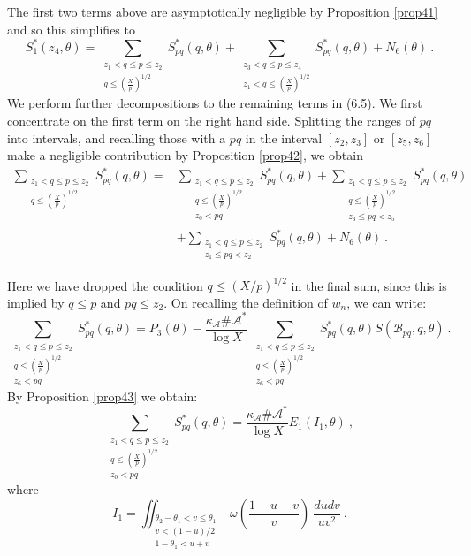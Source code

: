 \documentclass{amsart}
\numberwithin{equation}{subsection}
\begin{document}
The first two terms above are asymptotically negligible by Proposition \ref{prop41} and so this simplifies to
\[
S_1^*(z_4, \theta)=\sum_{\substack{z_1<q\leq p\leq z_2 \\ q\leq \left(\frac{X}{p}\right)^{1/2}}} S_{pq}^*(q, \theta)+ \sum_{\substack{z_3<q\leq p\leq z_4 \\ z_1<q\leq \left(\frac{X}{p}\right)^{1/2}}} S_{pq}^*(q, \theta) + N_6(\theta)\:. \tag{4.2}
\]
We perform further decompositions to the remaining terms in (6.5). We first concentrate on the first term on the right hand side. Splitting the ranges of $pq$ into intervals, and recalling those with a $pq$ in the interval $[z_2, z_3]$ or $[z_5, z_6]$ make a negligible contribution by Proposition \ref{prop42}, we obtain
\begin{align*}
\sum_{\substack{z_1<q\leq p\leq z_2 \\ q\leq \left(\frac{X}{p}\right)^{1/2}}} S_{pq}^*(q, \theta) =& \sum_{\substack{z_1<q\leq p\leq z_2 \\ q\leq \left(\frac{X}{p}\right)^{1/2} \\ z_0<pq}} S_{pq}^*(q, \theta)
+\sum_{\substack{z_1<q\leq p\leq z_2 \\ q\leq \left(\frac{X}{p}\right)^{1/2} \\ z_3\leq pq<z_5}} S_{pq}^*(q, \theta)\\ 
&+\sum_{\substack{z_1<q\leq p\leq z_2 \\ z_1\leq pq <z_2}} S_{pq}^*(q, \theta) + N_6(\theta)\:.   \tag{4.3}
\end{align*}

Here we have dropped the condition $q\leq (X/p)^{1/2}$ in the final sum, since this is implied by $q\leq p$ and $pq\leq z_2$. On recalling the definition of $w_n$, we can write:
$$\sum_{\substack{z_1<q\leq p\leq z_2 \\ q\leq \left(\frac{X}{p}\right)^{1/2} \\ z_6<pq}} S_{pq}^*(q, \theta)=P_3(\theta)-\frac{\kappa_{\mathcal{A}}\#\mathcal{A}^*}{\log X}\: \sum_{\substack{z_1<q\leq p\leq z_2 \\ q\leq \left(\frac{X}{p}\right)^{1/2} \\ z_6<pq}} S_{pq}^*(q, \theta)  S(\mathcal{B}_{pq}, q, \theta)\:.$$
By Proposition \ref{prop43} we obtain:
\[
\sum_{\substack{z_1<q\leq p\leq z_2 \\ q\leq \left(\frac{X}{p}\right)^{1/2} \\ z_0<pq}} S_{pq}^*(q, \theta)= \frac{\kappa_{\mathcal{A}}\#\mathcal{A}^*}{\log X} E_1(I_1, \theta)\:,   \tag{4.4}
\]
where
\[
I_1=\iint_{\substack{\theta_2-\theta_1<v\leq \theta_1 \\ v<(1-u)/2 \\ 1-\theta_1< u+v}} \omega\left(\frac{1-u-v}{v}\right)\: \frac{dudv}{uv^2} \:. \tag{4.5}
\]
\end{document}
